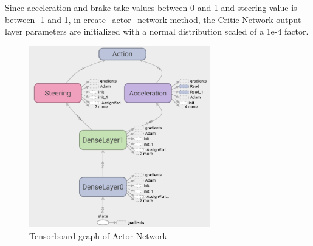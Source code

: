 \documentclass[Lau,oneside,noexaminfo]{sapthesis} %
\begin{document}
\clearpage
Since acceleration and brake take values between 0 and 1 and steering value is between -1 and 1, in create\_actor\_network method, the Critic Network output layer parameters are initialized with a normal distribution scaled of a 1e-4 factor.
\begin{figure}[H]
\caption{Tensorboard graph of Actor Network}
\centering
\includegraphics[width=0.7\textwidth]{actor}
\end{figure}
\end{document}
